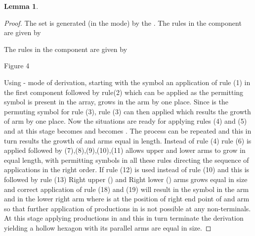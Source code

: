 \documentclass[11pt]{article}
\newtheorem{lemma}[theorem]{Lemma}
\begin{document}
\begin{lemma} 
\end{lemma}
\begin{proof}The set  is generated (in the  mode) by the
.
 The rules in the component are given by

 The rules in the component  are given by


\centerline{Figure 4} Using - mode of derivation, starting with
the symbol  an application of rule (1) in the first component
followed by rule(2) which can be applied as the permitting symbol
 is present in the array, grows in the  arm by one place.
Since  is the permuting symbol for rule (3), rule (3) can then
applied which results the growth of  arm by one place. Now the
situations are ready for applying rules (4) and (5) and at this
stage  becomes  and  becomes . The process can be
repeated and this in turn results the growth of  and  arms
equal in length. Instead of rule (4) rule (6) is applied followed
by (7),(8),(9),(10),(11) allows upper and lower arms to grow in
equal length, with permitting symbols in all these rules directing
the sequence of applications in the right order. If rule (12) is
used instead of rule (10) and this is followed by rule (13) Right
upper () and Right lower () arms grows equal in size and
correct application of rule (18) and (19) will result in the
symbol  in the  arm and  in the lower right arm  where
 is at the position of right end point of  and  arm so
that further application of productions in  is not possible
at any non-terminals. At this stage applying productions in
 and this in turn terminate the derivation yielding a
hollow hexagon with its parallel arms are equal in size.
\end{proof}
\end{document}
